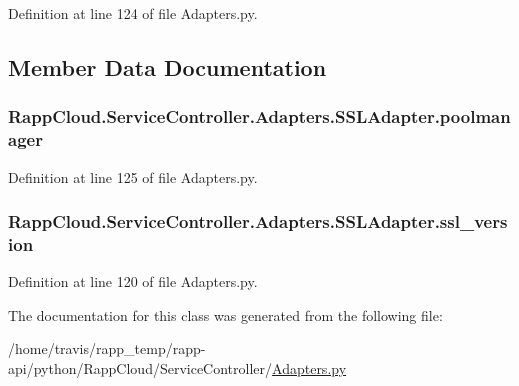Definition at line 124 of file Adapters.\-py.



\subsection{Member Data Documentation}
\hypertarget{classRappCloud_1_1ServiceController_1_1Adapters_1_1SSLAdapter_ab008dcf219f19980b538ae27e2e867b4}{
\subsubsection[{poolmanager}]{\setlength{\rightskip}{0pt plus 5cm}Rapp\-Cloud.\-Service\-Controller.\-Adapters.\-S\-S\-L\-Adapter.\-poolmanager}}\label{classRappCloud_1_1ServiceController_1_1Adapters_1_1SSLAdapter_ab008dcf219f19980b538ae27e2e867b4}


Definition at line 125 of file Adapters.\-py.

\hypertarget{classRappCloud_1_1ServiceController_1_1Adapters_1_1SSLAdapter_a85858093a2b00a440246173adea9940c}{
\subsubsection[{ssl\-\_\-version}]{\setlength{\rightskip}{0pt plus 5cm}Rapp\-Cloud.\-Service\-Controller.\-Adapters.\-S\-S\-L\-Adapter.\-ssl\-\_\-version}}\label{classRappCloud_1_1ServiceController_1_1Adapters_1_1SSLAdapter_a85858093a2b00a440246173adea9940c}


Definition at line 120 of file Adapters.\-py.



The documentation for this class was generated from the following file\-:\begin{DoxyCompactItemize}
\item 
/home/travis/rapp\-\_\-temp/rapp-\/api/python/\-Rapp\-Cloud/\-Service\-Controller/\hyperlink{Adapters_8py}{Adapters.\-py}\end{DoxyCompactItemize}
